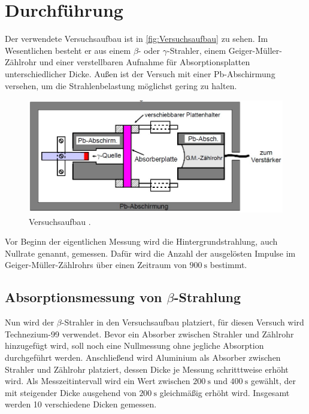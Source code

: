 \section{Durchführung}
\label{sec:Durchführung}

Der verwendete Versuchsaufbau ist in \autoref{fig:Versuchsaufbau} zu sehen.
Im Wesentlichen besteht er aus einem $\beta$- oder $\gamma$-Strahler, einem
Geiger-Müller-Zählrohr und einer verstellbaren Aufnahme für Absorptionsplatten unterschiedlicher
Dicke. Außen ist der Versuch mit einer Pb-Abschirmung versehen, um die Strahlenbelastung möglichst
gering zu halten.
\begin{figure}[H]
    \centering
    \includegraphics[height=5cm]{content/pics/versuch.jpg}
    \caption{Versuchsaufbau \cite{v704}.}
    \label{fig:Versuchsaufbau}
\end{figure}
Vor Beginn der eigentlichen Messung wird die Hintergrundstrahlung, auch Nullrate genannt, gemessen.
Dafür wird die Anzahl der ausgelösten Impulse im Geiger-Müller-Zählrohrs über einen Zeitraum von $\qty{900}{\second}$
bestimmt.

\subsection{\texorpdfstring{Absorptionsmessung von $\beta$-Strahlung}{Absorptionsmessung von Beta-Strahlung}}
\label{sec:seggs}
Nun wird der $\beta$-Strahler in den Versuchsaufbau platziert, für diesen Versuch wird Technezium-99 verwendet.
Bevor ein Absorber zwischen Strahler und Zählrohr hinzugefügt wird, soll noch eine Nullmessung ohne jegliche
Absorption durchgeführt werden.
Anschließend wird Aluminium als Absorber zwischen Strahler und Zählrohr platziert, dessen Dicke
je Messung schritttweise erhöht wird.
Als Messzeitintervall wird ein Wert zwischen $\qty{200}{\second}$ und $\qty{400}{\second}$ gewählt, der 
mit steigender Dicke ausgehend von $\qty{200}{\second}$ gleichmäßig erhöht wird.
Insgesamt werden 10 verschiedene Dicken gemessen.

